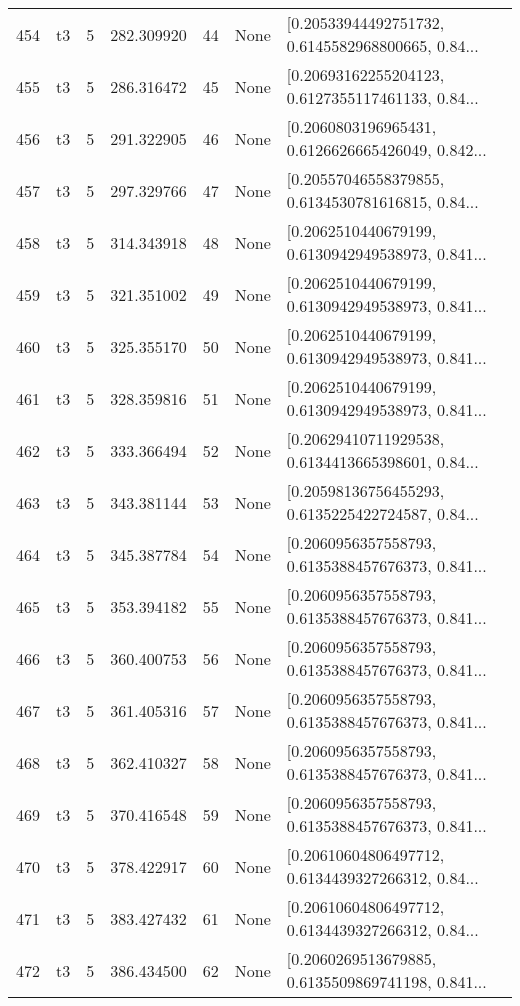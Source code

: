 \begin{tabular}{lllrlll}
454 &  t3 &   5 &  282.309920 &   44 &  None &  [0.20533944492751732, 0.6145582968800665, 0.84... \\
455 &  t3 &   5 &  286.316472 &   45 &  None &  [0.20693162255204123, 0.6127355117461133, 0.84... \\
456 &  t3 &   5 &  291.322905 &   46 &  None &  [0.2060803196965431, 0.6126626665426049, 0.842... \\
457 &  t3 &   5 &  297.329766 &   47 &  None &  [0.20557046558379855, 0.6134530781616815, 0.84... \\
458 &  t3 &   5 &  314.343918 &   48 &  None &  [0.2062510440679199, 0.6130942949538973, 0.841... \\
459 &  t3 &   5 &  321.351002 &   49 &  None &  [0.2062510440679199, 0.6130942949538973, 0.841... \\
460 &  t3 &   5 &  325.355170 &   50 &  None &  [0.2062510440679199, 0.6130942949538973, 0.841... \\
461 &  t3 &   5 &  328.359816 &   51 &  None &  [0.2062510440679199, 0.6130942949538973, 0.841... \\
462 &  t3 &   5 &  333.366494 &   52 &  None &  [0.20629410711929538, 0.6134413665398601, 0.84... \\
463 &  t3 &   5 &  343.381144 &   53 &  None &  [0.20598136756455293, 0.6135225422724587, 0.84... \\
464 &  t3 &   5 &  345.387784 &   54 &  None &  [0.2060956357558793, 0.6135388457676373, 0.841... \\
465 &  t3 &   5 &  353.394182 &   55 &  None &  [0.2060956357558793, 0.6135388457676373, 0.841... \\
466 &  t3 &   5 &  360.400753 &   56 &  None &  [0.2060956357558793, 0.6135388457676373, 0.841... \\
467 &  t3 &   5 &  361.405316 &   57 &  None &  [0.2060956357558793, 0.6135388457676373, 0.841... \\
468 &  t3 &   5 &  362.410327 &   58 &  None &  [0.2060956357558793, 0.6135388457676373, 0.841... \\
469 &  t3 &   5 &  370.416548 &   59 &  None &  [0.2060956357558793, 0.6135388457676373, 0.841... \\
470 &  t3 &   5 &  378.422917 &   60 &  None &  [0.20610604806497712, 0.6134439327266312, 0.84... \\
471 &  t3 &   5 &  383.427432 &   61 &  None &  [0.20610604806497712, 0.6134439327266312, 0.84... \\
472 &  t3 &   5 &  386.434500 &   62 &  None &  [0.2060269513679885, 0.6135509869741198, 0.841... \\

\end{tabular}
